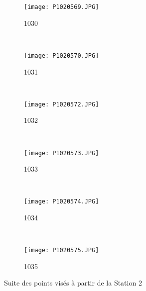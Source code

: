 \begin{figure}[!h]
    \centering
    \begin{subfigure}[b]{0.3\textwidth}
        \texttt{[image: P1020569.JPG]}
        \caption{1030}%
        \label{P1020569}
    \end{subfigure}
    ~
    \begin{subfigure}[b]{0.3\textwidth}
        \texttt{[image: P1020570.JPG]}
        \caption{1031}%
        \label{P1020570}
    \end{subfigure}
    ~
    \begin{subfigure}[b]{0.3\textwidth}
        \texttt{[image: P1020572.JPG]}
        \caption{1032}%
        \label{P1020572}
    \end{subfigure}
    \\
    \begin{subfigure}[b]{0.3\textwidth}
        \texttt{[image: P1020573.JPG]}
        \caption{1033}%
        \label{P1020573}
    \end{subfigure}
    ~
    \begin{subfigure}[b]{0.3\textwidth}
        \texttt{[image: P1020574.JPG]}
        \caption{1034}%
        \label{P1020574}
    \end{subfigure}
    ~
    \begin{subfigure}[b]{0.3\textwidth}
        \texttt{[image: P1020575.JPG]}
        \caption{1035}%
        \label{P1020575}
    \end{subfigure}
    \caption{Suite des points visés à partir de la Station 2}
    \label{Points Cibles S2b}
\end{figure}

